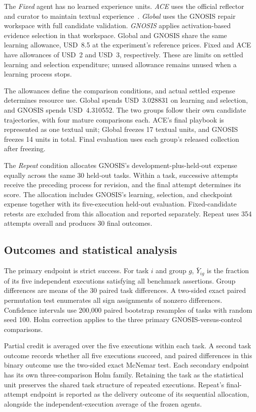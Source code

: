 \documentclass{ecai}
\begin{document}
The \emph{Fixed} agent has no learned experience units. \emph{ACE} uses the official reflector and curator to maintain textual experience~\cite{ace}. \emph{Global} uses the GNOSIS repair workspace with full candidate validation. \emph{GNOSIS} applies activation-based evidence selection in that workspace. Global and GNOSIS share the same learning allowance, USD~8.5 at the experiment's reference prices. Fixed and ACE have allowances of USD~2 and USD~3, respectively. These are limits on settled learning and selection expenditure; unused allowance remains unused when a learning process stops.

The allowances define the comparison conditions, and actual settled expense determines resource use. Global spends USD~3.028831 on learning and selection, and GNOSIS spends USD~4.310552. The two groups follow their own candidate trajectories, with four mature comparisons each. ACE's final playbook is represented as one textual unit; Global freezes 17 textual units, and GNOSIS freezes 14 units in total. Final evaluation uses each group's released collection after freezing.

The \emph{Repeat} condition allocates GNOSIS's development-plus-held-out expense equally across the same 30 held-out tasks. Within a task, successive attempts receive the preceding process for revision, and the final attempt determines its score. The allocation includes GNOSIS's learning, selection, and checkpoint expense together with its five-execution held-out evaluation. Fixed-candidate retests are excluded from this allocation and reported separately. Repeat uses 354 attempts overall and produces 30 final outcomes.

\subsection{Outcomes and statistical analysis}

The primary endpoint is strict success. For task $i$ and group $g$, $\bar Y_{ig}$ is the fraction of its five independent executions satisfying all benchmark assertions. Group differences are means of the 30 paired task differences. A two-sided exact paired permutation test enumerates all sign assignments of nonzero differences. Confidence intervals use 200,000 paired bootstrap resamples of tasks with random seed 100. Holm correction applies to the three primary GNOSIS-versus-control comparisons.

Partial credit is averaged over the five executions within each task. A second task outcome records whether all five executions succeed, and paired differences in this binary outcome use the two-sided exact McNemar test. Each secondary endpoint has its own three-comparison Holm family. Retaining the task as the statistical unit preserves the shared task structure of repeated executions. Repeat's final-attempt endpoint is reported as the delivery outcome of its sequential allocation, alongside the independent-execution average of the frozen agents.
\end{document}
